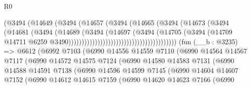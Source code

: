 \begin{lexlean}{R0}
\begin{coremodule}
                                                  (@3494
                                                    (@14649
                                                      (@3494
                                                        (@14657
                                                          (@3494
                                                            (@14665
                                                              (@3494
                                                                (@14673
                                                                  (@3494
                                                                    (@14681
                                                                      (@3494
                                                                        (@14689
                                                                          (@3494
                                                                            (@14697
                                                                              (@3494
                                                                                (@14705
                                                                                  (@3494
                                                                                    (@14709
                                                                                      @14711
                                                                                      @6259
                                                                                      @3490)))))))))))))))))))))))))))))))))))))))))
    (fun (__b : @3235) =>
    @6612
      (@6992
        @7103
        (@6990
          @14556
          @14559
          @7110
          (@6990
            @14564
            @14567
            @7117
            (@6990
              @14572
              @14575
              @7124
              (@6990
                @14580
                @14583
                @7131
                (@6990
                  @14588
                  @14591
                  @7138
                  (@6990
                    @14596
                    @14599
                    @7145
                    (@6990
                      @14604
                      @14607
                      @7152
                      (@6990
                        @14612
                        @14615
                        @7159
                        (@6990
                          @14620
                          @14623
                          @7166
                          (@6990

\end{coremodule}
\end{lexlean}
